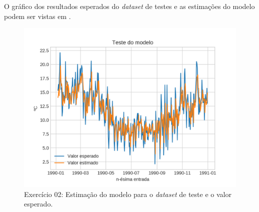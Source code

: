 \documentclass{article}
\begin{document}
    O gráfico dos resultados esperados do \textit{dataset} de testes e as estimações do modelo podem ser vistas em . 
    \begin{figure}[!ht]
        \centering
        \includegraphics[width=\linewidth]{ex02/model_test.png}
        \caption{Exercício 02: Estimação do modelo para o \textit{dataset} de teste e o valor esperado.}
        \label{fig:ex2_comp}
    \end{figure}
\end{document}
